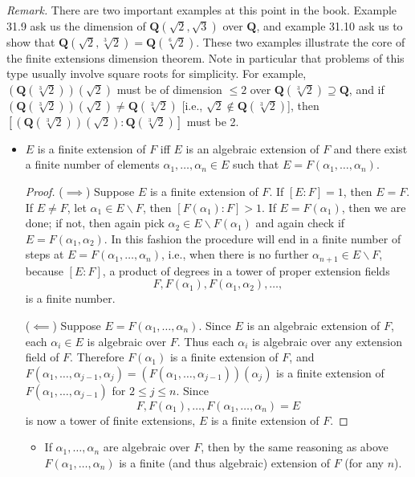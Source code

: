\documentclass[11pt]{article}
\newcommand{\rmk}{\noindent\textit{Remark. }}
\newcommand{\Q}{\mathbf{Q}}
\begin{document}
\rmk There are two important examples at this point in the book. Example 31.9 ask us the dimension of $\Q(\sqrt{2},\sqrt{3})$ over $\Q$, and example 31.10 ask us to show that $\Q(\sqrt{2},\sqrt[3]{2}) = \Q(\sqrt[6]{2})$. These two examples illustrate the core of the finite extensions dimension theorem. Note in particular that problems of this type usually involve square roots for simplicity. For example, $(\Q(\sqrt[3]{2}))(\sqrt{2})$ must be of dimension $\leq 2$ over $\Q(\sqrt[3]{2}) \supseteq \Q$, and if $(\Q(\sqrt[3]{2}))(\sqrt{2}) \neq \Q(\sqrt[3]{2})$ [i.e., $\sqrt{2} \notin \Q(\sqrt[3]{2})$], then $[(\Q(\sqrt[3]{2}))(\sqrt{2}) : \Q(\sqrt[3]{2})]$ must be 2.
\begin{itemize}
    \item $E$ is a finite extension of $F$ iff $E$ is an algebraic extension of $F$ and there exist a finite number of elements $\alpha_1,\dots,\alpha_n \in E$ such that $E = F(\alpha_1,\dots,\alpha_n)$.
    \begin{proof}
        ($\implies$) Suppose $E$ is a finite extension of $F$. If $[E:F] = 1$, then $E = F$. If $E \neq F$, let $\alpha_1 \in E\backslash F$, then $[F(\alpha_1):F] > 1$. If $E = F(\alpha_1)$, then we are done; if not, then again pick $\alpha_2 \in E\backslash F(\alpha_1)$ and again check if $E = F(\alpha_1,\alpha_2)$. In this fashion the procedure will end in a finite number of steps at $E = F(\alpha_1,\dots,\alpha_n)$, i.e., when there is no further $\alpha_{n+1} \in E\backslash F$, because $[E:F]$, a product of degrees in a tower of proper extension fields \[F,F(\alpha_1),F(\alpha_1,\alpha_2),\dots,\] is a finite number.
        
        ($\impliedby$) Suppose $E = F(\alpha_1,\dots,\alpha_n)$. Since $E$ is an algebraic extension of $F$, each $\alpha_i \in E$ is algebraic over $F$. Thus each $\alpha_i$ is algebraic over any extension field of $F$. Therefore $F(\alpha_1)$ is a finite extension of $F$, and $F(\alpha_1,\dots,\alpha_{j-1},\alpha_j) = (F(\alpha_1,\dots,\alpha_{j-1}))(\alpha_j)$ is a finite extension of $F(\alpha_1,\dots,\alpha_{j-1})$ for $2 \leq j \leq n$. Since \[F,F(\alpha_1),\dots,F(\alpha_1,\dots,\alpha_n) = E\] is now a tower of finite extensions, $E$ is a finite extension of $F$.
    \end{proof}
        \begin{itemize}
        \item If $\alpha_1,\dots,\alpha_n$ are algebraic over $F$, then by the same reasoning as above $F(\alpha_1,\dots,\alpha_n)$ is a finite (and thus algebraic) extension of $F$ (for any $n$).
        

\end{itemize}
\end{itemize}
\end{document}
